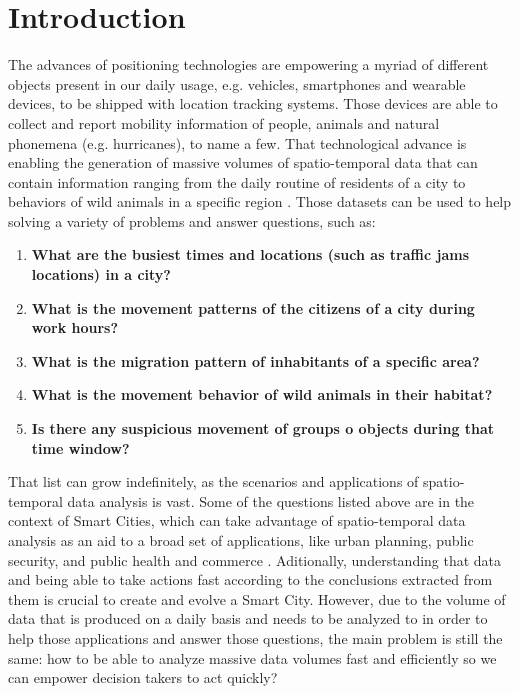 \chapter{Introduction}
\label{chp:introduction}
The advances of positioning technologies are empowering a myriad of different objects present in our daily usage, e.g.
vehicles, smartphones and wearable devices, to be shipped with location tracking systems. Those devices are able to
collect and report mobility information of people, animals and natural phonemena (e.g. hurricanes), to name a few. That
technological advance is enabling the generation of massive volumes of spatio-temporal data that can contain information
ranging from the daily routine of residents of a city \citep{whatdidyoudo} to behaviors of wild animals in a specific
region \citep{trajclustering}\citep{miningperiodic}. Those datasets can be used to help solving a variety of problems
%
%
and answer questions, such as:

\begin{enumerate}
    \item \textbf{What are the busiest times and locations (such as traffic jams locations) in a city?}
        \citep{visualtrafficjam}
    \item \textbf{What is the movement patterns of the citizens of a city during work hours?}
    \item \textbf{What is the migration pattern of inhabitants of a specific area?}
    \item \textbf{What is the movement behavior of wild animals in their habitat?} \citep{movemine}
    \item \textbf{Is there any suspicious movement of groups o objects during that time window?}
\end{enumerate}

That list can grow indefinitely, as the scenarios and applications of spatio-temporal data analysis is vast. Some of the
questions listed above are in the context of Smart Cities, which can take advantage of spatio-temporal data analysis as
an aid to a broad set of applications, like urban planning, public security, and public health and commerce
\citep{ieeesmartcities}. Aditionally, understanding that data and being able to take actions fast according to the
conclusions extracted from them is crucial to create and evolve a Smart City. However, due to the volume of data that is
produced on a daily basis and needs to be analyzed to in order to help those applications and answer those questions,
the main problem is still the same: how to be able to analyze massive data volumes fast and efficiently so we can
empower decision takers to act quickly?

